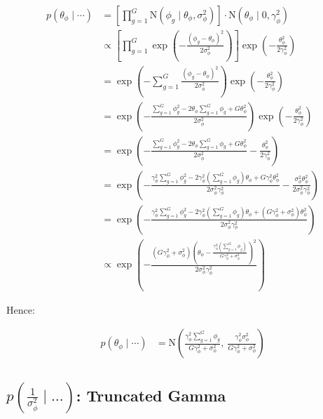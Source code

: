 \documentclass{article}\usepackage{graphicx, color}
\begin{document}
\begin{flushleft}
\begin{align*}
p(\theta_\phi \mid \cdots ) & = \left [ \prod_{g = 1}^G \text{N}( \phi_g \mid \theta_\phi, \sigma_\phi^2) \right] \cdot \text{N}(\theta_\phi \mid 0, \gamma_{\phi}^2) \\
&\propto \left [ \prod_{g = 1}^G \exp \left ( -\frac{(\phi_g - \theta_\phi)^2}{2 \sigma_\phi^2} \right) \right ] \exp \left ( - \frac{\theta_\phi^2}{2 \gamma_\phi^2} \right ) \\
&=  \exp \left ( - \sum_{g = 1}^G \frac{(\phi_g - \theta_\phi)^2}{2 \sigma_\phi^2} \right)  \exp \left ( - \frac{\theta_\phi^2}{2 \gamma_\phi^2} \right ) \\
&=  \exp \left ( -  \frac{\sum_{g = 1}^G\phi_g^2 -2  \theta_\phi \sum_{g = 1}^G \phi_g + G \theta_\phi^2}{2 \sigma_\phi^2} \right)  \exp \left ( - \frac{\theta_\phi^2}{2 \gamma_\phi^2} \right ) \\
&= \exp \left ( -  \frac{\sum_{g = 1}^G\phi_g^2 -2  \theta_\phi \sum_{g = 1}^G \phi_g + G \theta_\phi^2}{2 \sigma_\phi^2}  - \frac{\theta_\phi^2}{2 \gamma_\phi^2} \right ) \\
&= \exp \left ( -  \frac{ \gamma_\phi^2 \sum_{g = 1}^G \phi_g^2 -2  \gamma_\phi^2 (\sum_{g = 1}^G \phi_g) \theta_\phi + G \gamma_\phi^2 \theta_\phi^2}{2 \sigma_\phi^2 \gamma_\phi^2}  - \frac{\sigma_\phi^2 \theta_\phi^2}{2 \sigma_\phi^2 \gamma_\phi^2} \right ) \\
&= \exp \left ( -  \frac{ \gamma_\phi^2 \sum_{g = 1}^G \phi_g^2 -2  \gamma_\phi^2 (\sum_{g = 1}^G \phi_g) \theta_\phi + (G \gamma_\phi^2 + \sigma_\phi^2)\theta_\phi^2}{2 \sigma_\phi^2 \gamma_\phi^2} \right ) \\
&\propto \exp \left ( -  \frac{ (G \gamma_\phi^2 + \sigma_\phi^2) \left (\theta_\phi - \frac{\gamma_\phi^2  (\sum_{g = 1}^G \phi_g)}{G \gamma_\phi^2 + \sigma_\phi^2} \right )^2}{2 \sigma_\phi^2 \gamma_\phi^2} \right ) 
\end{align*}

Hence:

\begin{align*}
p(\theta_\phi \mid \cdots) &= \text{N} \left ( \frac{ \gamma_\phi^2 \sum_{g = 1}^G \phi_g}{G \gamma_\phi^2 + \sigma_\phi^2}, \ \frac{\gamma_\phi^2 \sigma_\phi^2}{G\gamma_\phi^2 + \sigma_\phi^2} \right )
\end{align*}








\subsection{$p\left ( \frac{1}{\sigma_\phi^2} \mid \ldots \right )$: Truncated Gamma}


\end{flushleft}
\end{document}
